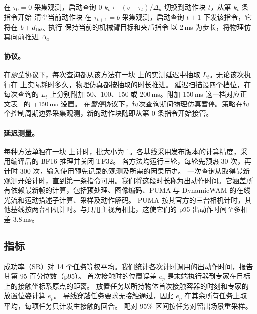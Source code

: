 \begin{algorithm}[t]
\caption{\textbf{原生延迟下的执行。}所有方法共用这一执行器。$L_t$ 从各方法的实测延迟中抽取。}
\label{alg:executor}
\footnotesize
\begin{algorithmic}[1]
\State 在 $\tau_0=0$ 采集观测，启动查询 0
    \State $k_t\gets(b-\tau_t)/\Delta_a$
      \State 切换到动作块 $t$，从第 $k_t$ 条指令开始
    \Else
      \State 清空当前动作块
    \EndIf
    \State 在 $\tau_{t+1}=b$ 采集观测，启动查询 $t+1$
  \EndIf
    \State 下发该指令，它将在 $b+d_{\rm task}$ 执行
  \Else
    \State 保持当前的机械臂目标和夹爪指令
  \EndIf
  \State 以 2\,ms 为步长，将物理仿真向前推进 $\Delta_a$
\EndFor
\end{algorithmic}
\end{algorithm}

\paragraph{协议。}
在\emph{原生}协议下，每次查询都从该方法在一块 \cfgGPU{} 上的实测延迟中抽取 $L_t$。无论该次执行在 \cfgEvalGPU{} 上实际耗时多久，物理仿真都按抽取的时长推进。
延迟扫描设四个档位，在每次查询的 $L_t$ 上分别附加 50、100、150 或 200\,ms。附加 150\,ms 这一档对应正文表~ 的 +150\,ms 设置。
在\emph{暂停}协议下，每次查询期间物理仿真暂停。策略在每个控制周期边界采集观测，新的动作块随即从第 0 条指令开始接管。

\paragraph{延迟测量。}
\label{app:timing}
每种方法单独在一块 \cfgGPU{} 上计时，批大小为 1。各基线采用发布版本的计算精度，\ours 采用编译后的 BF16 推理并关闭 TF32。
各方法均运行三轮，每轮先预热 30 次，再计时 300 次，输入使用预先记录的观测及所需的因果历史。
一次查询从取得最新观测开始计时，直到第一条指令可用。我们将这段时长称为出动作时间。它涵盖所有依赖最新帧的计算，包括预处理、图像编码、PUMA 与 DynamicWAM 的在线光流和运动描述子计算、采样及动作解码。
PUMA 按其官方的三台相机计时，其他基线按两台相机计时。与只用主视角相比，这使它们的 p95 出动作时间至多相差 3.8\,ms。

\subsection{指标}
\label{app:metrics}
\label{app:statistics}
成功率（SR）对 14 个任务等权平均。我们统计各次计时调用的出动作时间，报告其第 95 百分位数（p95）。
首次接触时的位置误差 $e_p$ 是末端执行器到专家在目标上的接触坐标系原点的距离。
放置任务以所持物体首次接触容器的时刻和专家的放置位姿计算 $e_p$。
导线穿越任务要求无接触通过，因此 $e_p$ 在其余所有任务上取平均，每项任务只计发生接触的回合。
配对 95\% 区间按任务对留出场景重采样。

